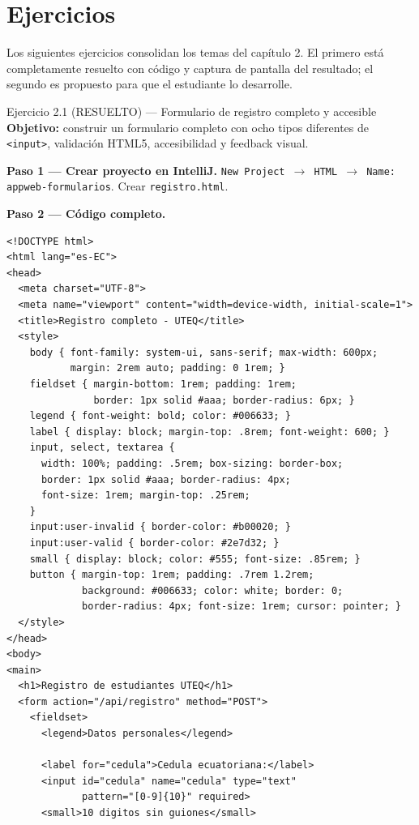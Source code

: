 \section{Ejercicios}

Los siguientes ejercicios consolidan los temas del capítulo 2.
El primero está completamente resuelto con código y captura de
pantalla del resultado; el segundo es propuesto para que el
estudiante lo desarrolle.


\begin{cajaejercicio}{Ejercicio 2.1 (RESUELTO) --- Formulario de registro completo y accesible}
\textbf{Objetivo:} construir un formulario completo con ocho tipos
diferentes de \texttt{<input>}, validación HTML5, accesibilidad y
feedback visual.

\textbf{Paso 1 --- Crear proyecto en IntelliJ.}
\texttt{New Project $\rightarrow$ HTML $\rightarrow$ Name:
appweb-formularios}. Crear \texttt{registro.html}.

\textbf{Paso 2 --- Código completo.}

\begin{lstlisting}[style=html,caption={registro.html},label=lst:2.14]
<!DOCTYPE html>
<html lang="es-EC">
<head>
  <meta charset="UTF-8">
  <meta name="viewport" content="width=device-width, initial-scale=1">
  <title>Registro completo - UTEQ</title>
  <style>
    body { font-family: system-ui, sans-serif; max-width: 600px;
           margin: 2rem auto; padding: 0 1rem; }
    fieldset { margin-bottom: 1rem; padding: 1rem;
               border: 1px solid #aaa; border-radius: 6px; }
    legend { font-weight: bold; color: #006633; }
    label { display: block; margin-top: .8rem; font-weight: 600; }
    input, select, textarea {
      width: 100%; padding: .5rem; box-sizing: border-box;
      border: 1px solid #aaa; border-radius: 4px;
      font-size: 1rem; margin-top: .25rem;
    }
    input:user-invalid { border-color: #b00020; }
    input:user-valid { border-color: #2e7d32; }
    small { display: block; color: #555; font-size: .85rem; }
    button { margin-top: 1rem; padding: .7rem 1.2rem;
             background: #006633; color: white; border: 0;
             border-radius: 4px; font-size: 1rem; cursor: pointer; }
  </style>
</head>
<body>
<main>
  <h1>Registro de estudiantes UTEQ</h1>
  <form action="/api/registro" method="POST">
    <fieldset>
      <legend>Datos personales</legend>

      <label for="cedula">Cedula ecuatoriana:</label>
      <input id="cedula" name="cedula" type="text"
             pattern="[0-9]{10}" required>
      <small>10 digitos sin guiones</small>


\end{lstlisting}
\end{cajaejercicio}
